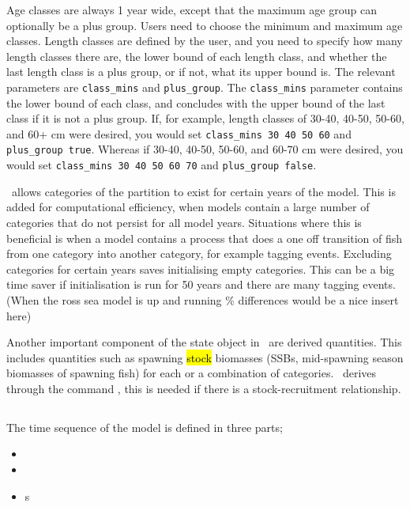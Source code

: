 Age classes are always 1 year wide, except that the maximum age group can optionally be a plus group. Users need to choose the minimum and maximum age classes. Length classes are defined by the user, and you need to specify how many length classes there are, the lower bound of each length class, and whether the last length class is a plus group, or if not, what its upper bound is. The relevant parameters are \texttt{class\_mins} and \texttt{plus\_group}. The \texttt{class\_mins} parameter contains the lower bound of each class, and concludes with the upper bound of the last class if it is not a plus group. If, for example, length classes of 30-40, 40-50, 50-60, and 60+ cm were desired, you would set \texttt{class\_mins 30 40 50 60} and \texttt{plus\_group true}. Whereas if 30-40, 40-50, 50-60, and 60-70 cm were desired, you would set \texttt{class\_mins 30 40 50 60 70} and \texttt{plus\_group false}.

\CNAME\ allows categories of the partition to exist for certain years of the model. This is added for computational efficiency, when models contain a large number of categories that do not persist for all model years. Situations where this is beneficial is when a model contains a process that does a one off transition of fish from one category into another category, for example tagging events. Excluding categories for certain years saves initialising empty categories. This can be a big time saver if initialisation is run for 50 years and there are many tagging events.(When the ross sea model is up and running \% differences would be a nice insert here)

Another important component of the state object in \CNAME\ are derived quantities. This includes quantities such as spawning \hl{stock} biomasses (SSBs, mid-spawning season biomasses of spawning fish) for each or a combination of categories. \CNAME\ derives through the command , this is needed if there is a stock-recruitment relationship.

\subsection{}

The time sequence of the model is defined in three parts;
\begin{itemize}
  \item {}
  \item {}
  \item {}s
\end{itemize}

